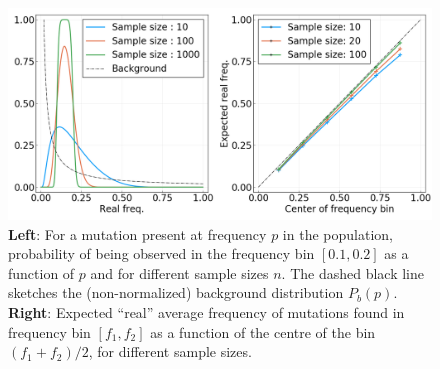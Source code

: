 \documentclass[reprint,amsmath,amssymb,superscriptaddress,showpacs,pre]{revtex4-1}
\begin{document}
	\begin{figure}
		\centering
		\includegraphics[scale=0.5]{SM_figures/frequency_biases.png}
		\caption{\textbf{Left}: For a mutation present at frequency $p$ in the population, probability of being observed in the frequency bin $[0.1, 0.2]$ as a function of $p$ and for different sample sizes $n$. The dashed black line sketches the (non-normalized) background distribution $P_b(p)$. \textbf{Right}: Expected ``real'' average frequency of mutations found in frequency bin $[f_1,f_2]$ as a function of the centre of the bin $(f_1+f_2)/2$, for different sample sizes.}
		\label{fig:freq_biases}
	\end{figure}
\end{document}

